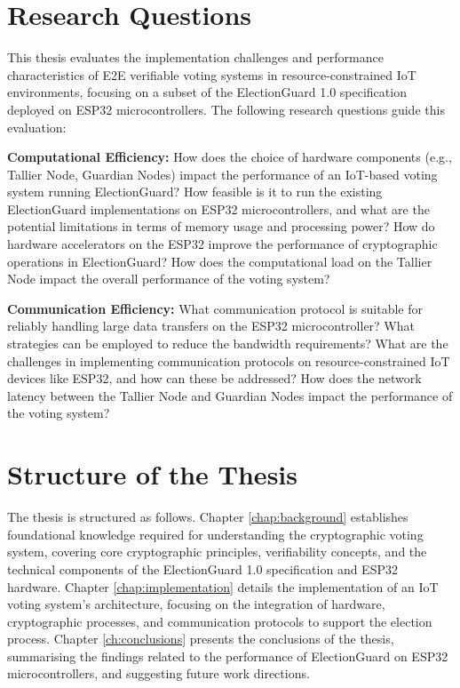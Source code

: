 \section{Research Questions}
This thesis evaluates the implementation challenges and performance characteristics of \ac{E2E} verifiable voting systems in resource-constrained \ac{IoT} environments, focusing on a subset of the ElectionGuard 1.0 specification deployed on ESP32 microcontrollers. The following research questions guide this evaluation:

\textbf{Computational Efficiency:} 
How does the choice of hardware components (e.g., Tallier Node, Guardian Nodes) impact the performance of an IoT-based voting system running ElectionGuard? 
How feasible is it to run the existing ElectionGuard implementations on ESP32 microcontrollers, and what are the potential limitations in terms of memory usage and processing power? 
How do hardware accelerators on the ESP32 improve the performance of cryptographic operations in ElectionGuard? 
How does the computational load on the Tallier Node impact the overall performance of the voting system? 

\textbf{Communication Efficiency:} 
What communication protocol is suitable for reliably handling large data transfers on the ESP32 microcontroller? What strategies can be employed to reduce the bandwidth requirements?
What are the challenges in implementing communication protocols on resource-constrained \ac{IoT} devices like ESP32, and how can these be addressed? 
How does the network latency between the Tallier Node and Guardian Nodes impact the performance of the voting system?

\section{Structure of the Thesis}
The thesis is structured as follows. Chapter \ref{chap:background} establishes foundational knowledge required for understanding the cryptographic voting system, covering core cryptographic principles, verifiability concepts, and the technical components of the ElectionGuard 1.0 specification and ESP32 hardware. Chapter \ref{chap:implementation} details the implementation of an \ac{IoT} voting system's architecture, focusing on the integration of hardware, cryptographic processes, and communication protocols to support the election process. Chapter \ref{ch:conclusions} presents the conclusions of the thesis, summarising the findings related to the performance of ElectionGuard on ESP32 microcontrollers, and suggesting future work directions.